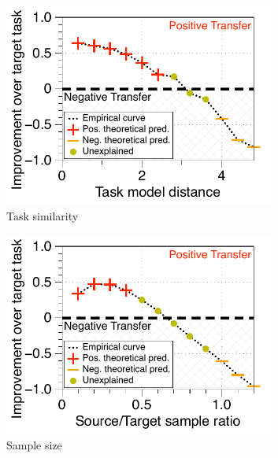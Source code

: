 \begin{figure}[!t]
	\begin{subfigure}[b]{0.32\textwidth}
		\centering
		\includegraphics[width=0.98\textwidth]{figures/model_shift_phase_transition.pdf}
		\vspace{-0.075in}
		\caption{Task similarity}
		\label{fig_model_shift}
	\end{subfigure}\hfill
	\begin{subfigure}[b]{0.32\textwidth}
		\centering
		\includegraphics[width=0.98\textwidth]{figures/datapoints_phase_transition.pdf}
		\vspace{-0.075in}
		\caption{Sample size}
		\label{fig_size}
	\end{subfigure}\hfill
	\begin{subfigure}[b]{0.32\textwidth}

\end{subfigure}
\end{figure}
